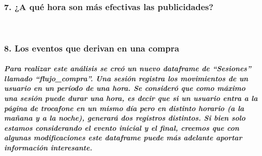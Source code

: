 \documentclass[11pt]{article}
\begin{document}
    \hypertarget{a-quuxe9-hora-son-muxe1s-efectivas-las-publicidades}{%
\subsubsection{7. ¿A qué hora son más efectivas las
publicidades?}\label{a-quuxe9-hora-son-muxe1s-efectivas-las-publicidades}}

    \begin{center}
    \end{center}
    { \hspace*{\fill} \\}
    
    \hypertarget{los-eventos-que-derivan-en-una-compra}{%
\subsubsection{8. Los eventos que derivan en una
compra}\label{los-eventos-que-derivan-en-una-compra}}

    \hypertarget{para-realizar-este-anuxe1lisis-se-creuxf3-un-nuevo-dataframe-de-sesiones-llamado-flujo_compra.-una-sesiuxf3n-registra-los-movimientos-de-un-usuario-en-un-peruxedodo-de-una-hora.-se-consideruxf3-que-como-muxe1ximo-una-sesiuxf3n-puede-durar-una-hora-es-decir-que-si-un-usuario-entra-a-la-puxe1gina-de-trocafone-en-un-mismo-duxeda-pero-en-distinto-horario-a-la-mauxf1ana-y-a-la-noche-generaruxe1-dos-registros-distintos.-si-bien-solo-estamos-considerando-el-evento-inicial-y-el-final-creemos-que-con-algunas-modificaciones-este-dataframe-puede-muxe1s-adelante-aportar-informaciuxf3n-interesante.}{%
\subparagraph{Para realizar este análisis se creó un nuevo dataframe de
``Sesiones'' llamado ``flujo\_compra''. Una sesión registra los
movimientos de un usuario en un período de una hora. Se consideró que
como máximo una sesión puede durar una hora, es decir que si un usuario
entra a la página de trocafone en un mismo día pero en distinto horario
(a la mañana y a la noche), generará dos registros distintos. Si bien
solo estamos considerando el evento inicial y el final, creemos que con
algunas modificaciones este dataframe puede más adelante aportar
información
interesante.}\label{para-realizar-este-anuxe1lisis-se-creuxf3-un-nuevo-dataframe-de-sesiones-llamado-flujo_compra.-una-sesiuxf3n-registra-los-movimientos-de-un-usuario-en-un-peruxedodo-de-una-hora.-se-consideruxf3-que-como-muxe1ximo-una-sesiuxf3n-puede-durar-una-hora-es-decir-que-si-un-usuario-entra-a-la-puxe1gina-de-trocafone-en-un-mismo-duxeda-pero-en-distinto-horario-a-la-mauxf1ana-y-a-la-noche-generaruxe1-dos-registros-distintos.-si-bien-solo-estamos-considerando-el-evento-inicial-y-el-final-creemos-que-con-algunas-modificaciones-este-dataframe-puede-muxe1s-adelante-aportar-informaciuxf3n-interesante.}}
\end{document}
